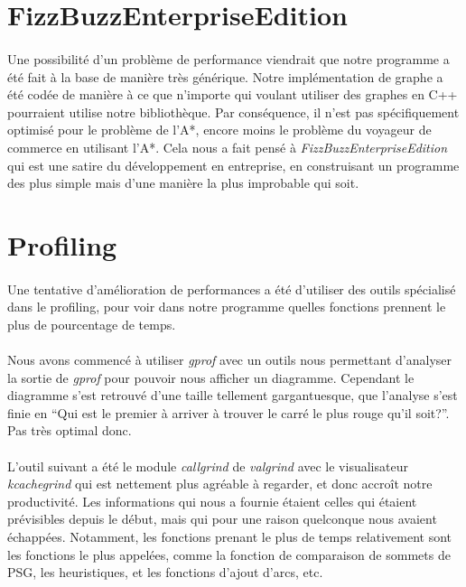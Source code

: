 \documentclass[french]{article}
\begin{document}
\section{FizzBuzzEnterpriseEdition}

\paragraph{} Une possibilité d'un problème de performance viendrait que notre
programme a été fait à la base de manière très générique. Notre implémentation
de graphe a été codée de manière à ce que n'importe qui voulant utiliser des
graphes en C++ pourraient utilise notre bibliothèque. Par conséquence, il n'est
pas spécifiquement optimisé pour le problème de l'A*, encore moins le problème
du voyageur de commerce en utilisant l'A*. Cela nous a fait pensé à
\emph{FizzBuzzEnterpriseEdition}~\cite{fun:fizzbuzz} qui est une satire du
développement en entreprise, en construisant un programme des plus simple mais
d'une manière la plus improbable qui soit.

\section{Profiling}

\paragraph{} Une tentative d'amélioration de performances a été d'utiliser des
outils spécialisé dans le profiling, pour voir dans notre programme quelles
fonctions prennent le plus de pourcentage de temps.

\paragraph{} Nous avons commencé à utiliser \emph{gprof} avec un outils nous
permettant d'analyser la sortie de \emph{gprof} pour pouvoir nous afficher un
diagramme. Cependant le diagramme s'est retrouvé d'une taille tellement
gargantuesque, que l'analyse s'est finie en ``Qui est le premier à arriver à
trouver le carré le plus rouge qu'il soit?''. Pas très optimal donc.

\paragraph{} L'outil suivant a été le module \emph{callgrind} de
\emph{valgrind} avec le visualisateur \emph{kcachegrind} qui est nettement plus
agréable à regarder, et donc accroît notre productivité. Les informations qui
nous a fournie étaient celles qui étaient prévisibles depuis le début, mais qui
pour une raison quelconque nous avaient échappées. Notamment, les fonctions
prenant le plus de temps relativement sont les fonctions le plus appelées,
comme la fonction de comparaison de sommets de PSG, les heuristiques, et les
fonctions d'ajout d'arcs, etc.
\end{document}
